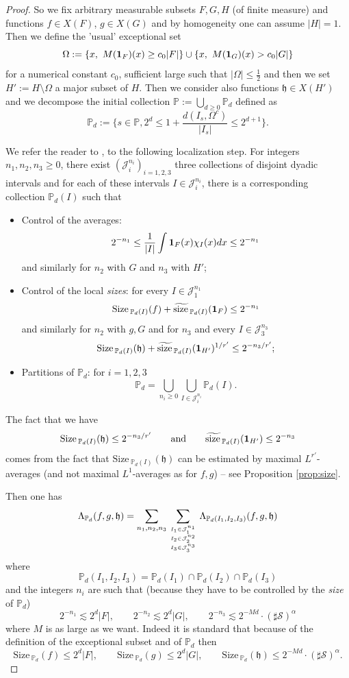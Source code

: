\documentclass[a4paper,11pt,oneside]{amsart}
\newcommand{\hh}{\mathfrak{h}}
\newcommand{\PP}{\mathbb{P}}
\newcommand{\size}{\mathrm{Size\, }}
\newcommand{\ssize}{\widetilde{\mathrm{size}\,}}
\theoremstyle{plain}
\theoremstyle{definition}
\begin{document}
\begin{proof}
So we fix arbitrary measurable subsets $F,G,H$ (of finite measure) and functions $f\in X(F)$, $g\in X(G)$ and by homogeneity one can assume $|H|=1$. Then we define the 'usual' exceptional set
$$ \Omega:=\{x,\ M({\bf 1}_{F})(x) \geq c_0 |F|\} \cup \{x,\ M({\bf 1}_{G})(x)> c_0 |G|\}$$
for a numerical constant $c_0$, sufficient large such that $|\Omega|\leq \frac{1}{2}$ and then we set $H':=H\setminus \Omega$ a major subset of $H$.
Then we consider also functions $\hh\in X(H')$ and we decompose the initial collection $\PP:=\bigcup_{d\geq 0} \PP_d$ defined as
$$ \PP_d:=\{s\in \PP, 2^d \leq 1+\frac{d(I_s,\Omega^c)}{|I_s|}\leq 2^{d+1} \}.$$

We refer the reader to \cite[section 6]{BB}, to the following localization step. For integers $n_1,n_2,n_3\geq 0$, there exist $({\mathcal J}_i^{n_i})_{i=1,2,3}$ three collections of disjoint dyadic intervals and for each of these intervals $I\in {\mathcal J}_i^{n_i}$, there is a corresponding collection $\PP_d(I)$ such that
\begin{itemize}
\item[(a)] Control of the averages:
$$ 2^{-n_1} \leq \frac{1}{|I|}\int {\bf 1}_{F}(x) \chi_{I}(x) dx \leq 2^{-n_1}$$
and similarly for $n_2$ with $G$ and $n_3$ with $H'$;
\item[(b)] Control of the local {\it sizes}: for every $I\in {\mathcal J}_1^{n_1}$
$$ \size_{\PP_d(I)}(f) + \ssize_{\PP_d(I)}({\bf 1}_F) \leq 2^{-n_1}$$
and similarly for $n_2$ with $g,G$ and  for $n_3$ and every $I\in {\mathcal J}_3^{n_3}$
$$ \size_{\PP_d(I)}(\hh) + \ssize_{\PP_d(I)}({\bf 1}_{H'})^{1/r'} \leq 2^{-n_3/r'};$$
\item[(c)] Partitions of $\PP_d$: for $i=1,2,3$
$$ \PP_d= \bigcup_{n_i\geq 0} \bigcup_{I\in{\mathcal J}_i^{n_i}} \PP_d(I).$$
\end{itemize}

The fact that we have
$$ \size_{\PP_d(I)}(\hh)\leq 2^{-n_3/r'} \qquad \textrm{and} \qquad \ssize_{\PP_d(I)}({\bf 1}_{H'}) \leq 2^{-n_3}$$
comes from the fact that $\size_{\PP_d(I)}(\hh)$ can be estimated by maximal $L^{r'}$-averages (and not maximal $L^1$-averages as for $f,g$) -- see Proposition \ref{prop:size}.

Then one has
$$ \Lambda_{\PP_d}(f,g,\hh) = \sum_{n_1,n_2,n_3} \sum_{I_1\in{\mathcal J}_1^{n_1} \atop {I_2\in{\mathcal J}_2^{n_2} \atop I_3\in{\mathcal J}_3^{n_3}}} \Lambda_{\PP_d(I_1,I_2,I_3)}(f,g,\hh)$$
where
$$\PP_d(I_1,I_2,I_3)=\PP_d(I_1) \cap \PP_d(I_2) \cap \PP_d(I_3)$$
and the integers $n_i$ are such that (because they have to be controlled by the {\it size} of $\PP_d$) 
$$ 2^{-n_1}\lesssim 2^d |F|, \qquad 2^{-n_2} \lesssim 2^d|G|, \qquad 2^{-n_3} \lesssim 2^{-Md} \cdot (\sharp {\mathcal S})^{\alpha}$$
where $M$ is as large as we want. Indeed it is standard that because of the definition of the exceptional subset and of $\PP_d$ then
$$ \size_{\PP_d}(f) \leq 2^{d} |F|, \qquad \size_{\PP_d}(g) \leq 2^{d} |G|, \qquad \size_{\PP_d}(\hh) \leq 2^{-Md} \cdot (\sharp {\mathcal S})^{\alpha}.$$ 


\end{proof}
\end{document}
